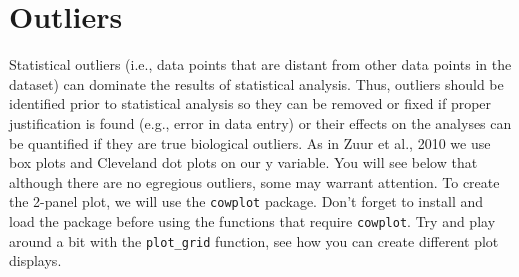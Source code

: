 \documentclass[
]{book}
\newenvironment{Shaded}{\begin{snugshade}}{\end{snugshade}}
\newcommand{\AttributeTok}[1]{\textcolor[rgb]{0.13,0.29,0.53}{#1}}
\newcommand{\CommentTok}[1]{\textcolor[rgb]{0.56,0.35,0.01}{\textit{#1}}}
\newcommand{\ConstantTok}[1]{\textcolor[rgb]{0.56,0.35,0.01}{#1}}
\newcommand{\DecValTok}[1]{\textcolor[rgb]{0.00,0.00,0.81}{#1}}
\newcommand{\FloatTok}[1]{\textcolor[rgb]{0.00,0.00,0.81}{#1}}
\newcommand{\FunctionTok}[1]{\textcolor[rgb]{0.13,0.29,0.53}{\textbf{#1}}}
\newcommand{\NormalTok}[1]{#1}
\newcommand{\OtherTok}[1]{\textcolor[rgb]{0.56,0.35,0.01}{#1}}
\newcommand{\SpecialCharTok}[1]{\textcolor[rgb]{0.81,0.36,0.00}{\textbf{#1}}}
\newcommand{\StringTok}[1]{\textcolor[rgb]{0.31,0.60,0.02}{#1}}
\begin{document}
\begin{Shaded}
\end{Shaded}

\hypertarget{outliers}{%
\section{Outliers}\label{outliers}}

Statistical outliers (i.e., data points that are distant from other data points in the dataset) can dominate the results of statistical analysis. Thus, outliers should be identified prior to statistical analysis so they can be removed or fixed if proper justification is found (e.g., error in data entry) or their effects on the analyses can be quantified if they are true biological outliers. As in Zuur et al., 2010 we use box plots and Cleveland dot plots on our y variable. You will see below that although there are no egregious outliers, some may warrant attention. To create the 2-panel plot, we will use the \texttt{cowplot} package. Don't forget to install and load the package before using the functions that require \texttt{cowplot}. Try and play around a bit with the \texttt{plot\_grid} function, see how you can create different plot displays.
\end{document}
